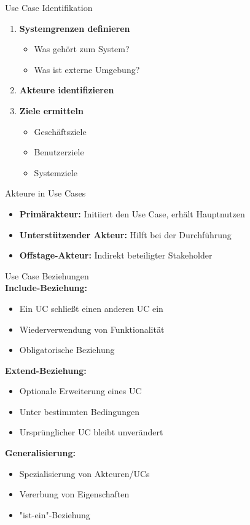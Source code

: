 \begin{theorem}{Use Case Identifikation}
\begin{enumerate}
    \item \textbf{Systemgrenzen definieren}
    \begin{itemize}
        \item Was gehört zum System?
        \item Was ist externe Umgebung?
    \end{itemize}
    \item \textbf{Akteure identifizieren}
    \item \textbf{Ziele ermitteln}
    \begin{itemize}
        \item Geschäftsziele
        \item Benutzerziele
        \item Systemziele
    \end{itemize}
\end{enumerate}
\end{theorem}

\begin{corollary}{Akteure in Use Cases}
\begin{itemize}
    \item \textbf{Primärakteur:} Initiiert den Use Case, erhält Hauptnutzen
    \item \textbf{Unterstützender Akteur:} Hilft bei der Durchführung
    \item \textbf{Offstage-Akteur:} Indirekt beteiligter Stakeholder
\end{itemize}
\end{corollary}

\begin{concept}{Use Case Beziehungen}\\
\textbf{Include-Beziehung:}
\begin{itemize}
    \item Ein UC schließt einen anderen UC ein
    \item Wiederverwendung von Funktionalität
    \item Obligatorische Beziehung
\end{itemize}

\textbf{Extend-Beziehung:}
\begin{itemize}
    \item Optionale Erweiterung eines UC
    \item Unter bestimmten Bedingungen
    \item Ursprünglicher UC bleibt unverändert
\end{itemize}

\textbf{Generalisierung:}
\begin{itemize}
    \item Spezialisierung von Akteuren/UCs
    \item Vererbung von Eigenschaften
    \item "ist-ein"-Beziehung
\end{itemize}
\end{concept}

